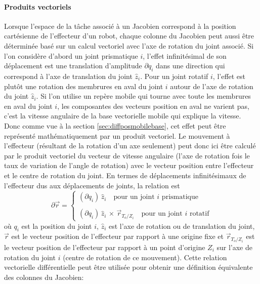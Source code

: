 \paragraph{Produits vectoriels}

Lorsque l'espace de la tâche associé à un Jacobien correspond à la position cartésienne de l'effecteur d'un robot, chaque colonne du Jacobien peut aussi être déterminée basé sur un calcul vectoriel avec l'axe de rotation du joint associé. Si l'on considère d'abord un joint prismatique $i$, l'effet infinitésimal de son déplacement est une translation d'amplitude $\partial q_i$ dans une direction qui correspond à l'axe de translation du joint $\hat{z}_i$. Pour un joint rotatif $i$, l'effet est plutôt une rotation des membrures en aval du joint $i$ autour de l'axe de rotation du joint $\hat{z}_i$. Si l'on utilise un repère mobile qui tourne avec toute les membrures en aval du joint $i$, les composantes des vecteurs position en aval ne varient pas, c'est la vitesse angulaire de la base vectorielle mobile qui explique la vitesse. Donc comme vue à la section \ref{sec:diffposmobilebase}, cet effet peut être représenté mathématiquement par un produit vectoriel. Le mouvement à l'effecteur (résultant de la rotation d'un axe seulement) peut donc ici être calculé par le produit vectoriel du vecteur de vitesse angulaire (l'axe de rotation fois le taux de variation de l'angle de rotation) avec le vecteur position entre l'effecteur et le centre de rotation du joint. En termes de déplacements infinitésimaux de l'effecteur dus aux déplacements de joints, la relation est
\begin{equation}
	\partial \Vec{r} = \left\{ \begin{array}{c}
								   \left( \partial q_i \right) \, \hat{z}_i \quad \text{pour un joint $i$ prismatique}
								   \\ \\
								   \left( \partial q_i \right) \, \hat{z}_i \, \times \, \vec{r}_{T_o/Z_i}
								   \quad \text{pour un joint $i$ rotatif}
	\end{array}
	\right.
\end{equation}
où $q_i$ est la position du joint $i$, $\hat{z}_i$ est l'axe de rotation ou de translation du joint, $\vec{r}$ est le vecteur position de l'effecteur par rapport à une origine fixe et $\vec{r}_{T_o/Z_i}$ est le vecteur position de l'effecteur par rapport à un point d'origine $Z_i$ sur l'axe de rotation du joint $i$ (centre de rotation de ce mouvement). Cette relation vectorielle différentielle peut être utilisée pour obtenir une définition équivalente des colonnes du Jacobien:
